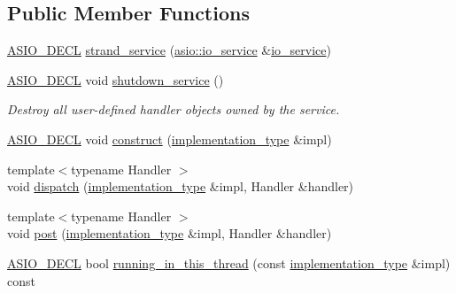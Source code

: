 \subsection*{Public Member Functions}
\begin{DoxyCompactItemize}
\item 
\hyperlink{config_8hpp_ab54d01ea04afeb9a8b39cfac467656b7}{A\+S\+I\+O\+\_\+\+D\+E\+C\+L} \hyperlink{classasio_1_1detail_1_1strand__service_adf6d552bb6c3c29769a3470d4195593e}{strand\+\_\+service} (\hyperlink{classasio_1_1io__service}{asio\+::io\+\_\+service} \&\hyperlink{classasio_1_1io__service}{io\+\_\+service})
\item 
\hyperlink{config_8hpp_ab54d01ea04afeb9a8b39cfac467656b7}{A\+S\+I\+O\+\_\+\+D\+E\+C\+L} void \hyperlink{classasio_1_1detail_1_1strand__service_a8d0cfe4d8d6d5f3fd75f968157992644}{shutdown\+\_\+service} ()
\begin{DoxyCompactList}\small\item\em Destroy all user-\/defined handler objects owned by the service. \end{DoxyCompactList}\item 
\hyperlink{config_8hpp_ab54d01ea04afeb9a8b39cfac467656b7}{A\+S\+I\+O\+\_\+\+D\+E\+C\+L} void \hyperlink{classasio_1_1detail_1_1strand__service_abe92af2b27d8817a56396308bf644aa8}{construct} (\hyperlink{classasio_1_1detail_1_1strand__service_ae3f87cc0ee8977c0ed0ee8e35ebe2491}{implementation\+\_\+type} \&impl)
\item 
{\footnotesize template$<$typename Handler $>$ }\\void \hyperlink{classasio_1_1detail_1_1strand__service_a912c9183e381329b109e89f9e54db11f}{dispatch} (\hyperlink{classasio_1_1detail_1_1strand__service_ae3f87cc0ee8977c0ed0ee8e35ebe2491}{implementation\+\_\+type} \&impl, Handler \&handler)
\item 
{\footnotesize template$<$typename Handler $>$ }\\void \hyperlink{classasio_1_1detail_1_1strand__service_a9e5dd38161d27517558096d433df5c2d}{post} (\hyperlink{classasio_1_1detail_1_1strand__service_ae3f87cc0ee8977c0ed0ee8e35ebe2491}{implementation\+\_\+type} \&impl, Handler \&handler)
\item 
\hyperlink{config_8hpp_ab54d01ea04afeb9a8b39cfac467656b7}{A\+S\+I\+O\+\_\+\+D\+E\+C\+L} bool \hyperlink{classasio_1_1detail_1_1strand__service_a0206f4dfeb98dd56a40079d8667ec701}{running\+\_\+in\+\_\+this\+\_\+thread} (const \hyperlink{classasio_1_1detail_1_1strand__service_ae3f87cc0ee8977c0ed0ee8e35ebe2491}{implementation\+\_\+type} \&impl) const 
\end{DoxyCompactItemize}
